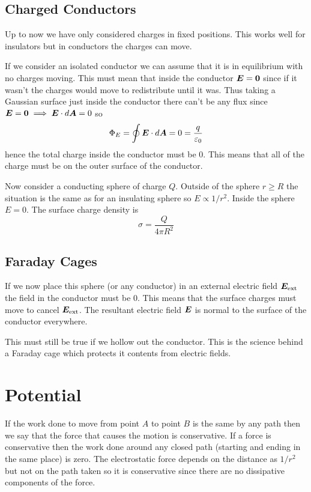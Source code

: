 \documentclass{article}
\begin{document}
    \subsection{Charged Conductors}
    Up to now we have only considered charges in fixed positions.
    This works well for insulators but in conductors the charges can move.
    
    If we consider an isolated conductor we can assume that it is in equilibrium with no charges moving.
    This must mean that inside the conductor \(\bm{E} = \bm{0}\) since if it wasn't the charges would move to redistribute until it was.
    Thus taking a Gaussian surface just inside the conductor there can't be any flux since \(\bm{E} = \bm{0} \implies \bm{E}\cdot d\bm{A} = 0\) so
    \[\Phi_E = \oint \bm{E}\cdot d\bm{A} = 0 = \frac{q}{\varepsilon_0}\]
    hence the total charge inside the conductor must be 0.
    This means that all of the charge must be on the outer surface of the conductor.
    
    \example
    Now consider a conducting sphere of charge \(Q\).
    Outside of the sphere \(r \ge R\) the situation is the same as for an insulating sphere so \(E \propto 1/r^2\).
    Inside the sphere \(E = 0\).
    The surface charge density is
    \[\sigma = \frac{Q}{4\pi R^2}\]
    
    \subsection{Faraday Cages}
    If we now place this sphere (or any conductor) in an external electric field \(\bm{E}_\text{ext}\) the field in the conductor must be \(0\).
    This means that the surface charges must move to cancel \(\bm{E}_\text{ext}\).
    The resultant electric field \(\bm{E}\) is normal to the surface of the conductor everywhere.
    
    This must still be true if we hollow out the conductor.
    This is the science behind a Faraday cage which protects it contents from electric fields.
    
    \section{Potential}
    If the work done to move from point \(A\) to point \(B\) is the same by any path then we say that the force that causes the motion is conservative.
    If a force is conservative then the work done around any closed path (starting and ending in the same place) is zero.
    The electrostatic force depends on the distance as \(1/r^2\) but not on the path taken so it is conservative since there are no dissipative components of the force.
    
\end{document}
